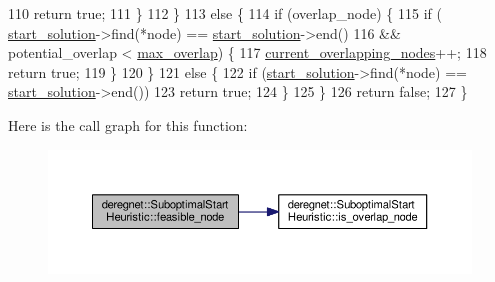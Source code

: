 \begin{DoxyCode}
110                 \textcolor{keywordflow}{return} \textcolor{keyword}{true};
111         \}
112     \}
113     \textcolor{keywordflow}{else} \{
114         \textcolor{keywordflow}{if} (overlap\_node) \{
115             \textcolor{keywordflow}{if} (   \hyperlink{classderegnet_1_1DeregnetStartHeuristic_a7450e11ca0a265b055f95e7832b65e2f}{start\_solution}->find(*node) == \hyperlink{classderegnet_1_1DeregnetStartHeuristic_a7450e11ca0a265b055f95e7832b65e2f}{start\_solution}->end()
116                 && potential\_overlap < \hyperlink{classderegnet_1_1SuboptimalStartHeuristic_ab7da09c5dc0c3fd13e19d254319ab3ba}{max\_overlap}) \{
117                 \hyperlink{classderegnet_1_1SuboptimalStartHeuristic_a422ca9127a469117bab51ae3eb2fbdcf}{current\_overlapping\_nodes}++;
118                 \textcolor{keywordflow}{return} \textcolor{keyword}{true};
119             \}
120         \}
121         \textcolor{keywordflow}{else} \{
122             \textcolor{keywordflow}{if} (\hyperlink{classderegnet_1_1DeregnetStartHeuristic_a7450e11ca0a265b055f95e7832b65e2f}{start\_solution}->find(*node) == \hyperlink{classderegnet_1_1DeregnetStartHeuristic_a7450e11ca0a265b055f95e7832b65e2f}{start\_solution}->end())
123                 \textcolor{keywordflow}{return} \textcolor{keyword}{true};
124         \}
125     \}
126     \textcolor{keywordflow}{return} \textcolor{keyword}{false};
127 \}
\end{DoxyCode}


Here is the call graph for this function\+:\nopagebreak
\begin{figure}[H]
\begin{center}
\leavevmode
\includegraphics[width=350pt]{classderegnet_1_1SuboptimalStartHeuristic_acbd151d7620495d80be8c63f1d3c4ecb_cgraph}
\end{center}
\end{figure}


